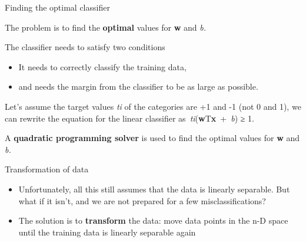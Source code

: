 \documentclass[compress]{beamer}
\providecommand{\tightlist}{%
  \setlength{\itemsep}{0pt}\setlength{\parskip}{0pt}}
\begin{document}
\begin{frame}{Finding the optimal classifier}

The problem is to find the \textbf{optimal} values for \textbf{w} and
\emph{b.}

The classifier needs to satisfy two conditions

\begin{itemize}
\tightlist
\item
  It needs to correctly classify the training data,
\item
  and needs the margin from the classifier to be as large as possible.
\end{itemize}

Let's assume the target values \emph{ti} of the categories are +1 and -1
(not 0 and 1), we can rewrite the equation for the linear classifier
as~\emph{ti}(\textbf{w}T\textbf{x}~+~\emph{b}) ≥ 1.

A \textbf{quadratic programming solver} is used to find the optimal
values for \textbf{w} and \emph{b.}

\end{frame}

\begin{frame}{Transformation of data}

\begin{itemize}
\tightlist
\item
  Unfortunately, all this still assumes that the data is linearly
  separable. But what if it isn't, and we are not prepared for a few
  misclassifications?
\item
  The solution is to \textbf{transform} the data: move data points in
  the n-D space until the training data is linearly separable again
\end{itemize}

\end{frame}
\end{document}
